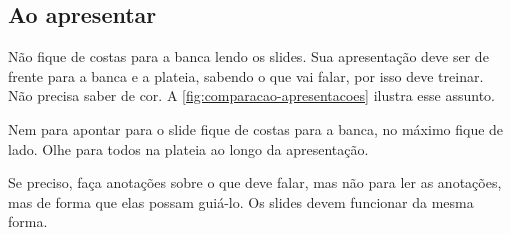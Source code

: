 \subsection{Ao apresentar}

Não fique de costas para a banca lendo os slides. Sua apresentação deve ser de frente para a banca e a plateia, sabendo o que vai falar, por isso deve treinar. Não precisa saber de cor. A \autoref{fig:comparacao-apresentacoes} ilustra esse assunto. 

Nem para apontar para o slide fique de costas para a banca, no máximo fique de lado. Olhe para todos na plateia ao longo da apresentação.

Se preciso, faça anotações sobre o que deve falar, mas não para ler as anotações, mas de forma que elas possam guiá-lo. Os slides devem funcionar da mesma forma.

